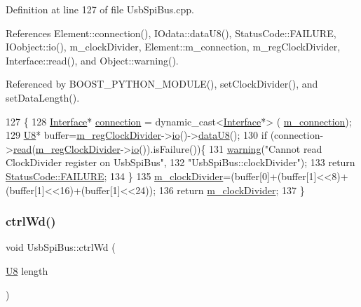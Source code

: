 Definition at line 127 of file Usb\+Spi\+Bus.\+cpp.



References Element\+::connection(), I\+Odata\+::data\+U8(), Status\+Code\+::\+F\+A\+I\+L\+U\+RE, I\+Oobject\+::io(), m\+\_\+clock\+Divider, Element\+::m\+\_\+connection, m\+\_\+reg\+Clock\+Divider, Interface\+::read(), and Object\+::warning().



Referenced by B\+O\+O\+S\+T\+\_\+\+P\+Y\+T\+H\+O\+N\+\_\+\+M\+O\+D\+U\+L\+E(), set\+Clock\+Divider(), and set\+Data\+Length().


\begin{DoxyCode}
127                                          \{
128   \hyperlink{classInterface}{Interface}* \hyperlink{classElement_af57444353c1ddf9fa0109801e97debf7}{connection} = \textcolor{keyword}{dynamic\_cast<}\hyperlink{classInterface}{Interface}*\textcolor{keyword}{>} (
      \hyperlink{classElement_abe3de7a5dbbc9a6dd2d7e012e5fdb266}{m\_connection});
129   \hyperlink{ICECALv3_8h_a3cb25ca6f51f003950f9625ff05536fc}{U8}* buffer=\hyperlink{classUsbSpiBus_abfd5f040a0a8c19d972b26ea581bf1f0}{m\_regClockDivider}->\hyperlink{classIOobject_af04fb94137c3d86849f478ac5afab5d1}{io}()->\hyperlink{classIOdata_a75e9c318dbac3a39402179070943d4bc}{dataU8}();
130   \textcolor{keywordflow}{if} (connection->\hyperlink{classInterface_a99136b67c8e6cbcaa0477c36940ac2ef}{read}(\hyperlink{classUsbSpiBus_abfd5f040a0a8c19d972b26ea581bf1f0}{m\_regClockDivider}->\hyperlink{classIOobject_af04fb94137c3d86849f478ac5afab5d1}{io}()).isFailure())\{
131     \hyperlink{classObject_a65cd4fda577711660821fd2cd5a3b4c9}{warning}(\textcolor{stringliteral}{"Cannot read ClockDivider register on UsbSpiBus"},
132         \textcolor{stringliteral}{"UsbSpiBus::clockDivider"});
133     \textcolor{keywordflow}{return} \hyperlink{classStatusCode_a6f565cbeadc76d14c72f047e5e85eb4ba3da73d4c469762eb9d3c960368252b26}{StatusCode::FAILURE};
134   \} 
135   \hyperlink{classUsbSpiBus_a5a4de2b61018f52b885559ce07bd3161}{m\_clockDivider}=(buffer[0]+(buffer[1]<<8)+(buffer[1]<<16)+(buffer[1]<<24));
136   \textcolor{keywordflow}{return} \hyperlink{classUsbSpiBus_a5a4de2b61018f52b885559ce07bd3161}{m\_clockDivider};
137 \}
\end{DoxyCode}
\mbox{\label{classUsbSpiBus_a150304008d73d14c93d25765050ddb05}} 
\subsubsection{\texorpdfstring{ctrl\+Wd()}{ctrlWd()}}
{\footnotesize\ttfamily void Usb\+Spi\+Bus\+::ctrl\+Wd (\begin{DoxyParamCaption}\item[{\hyperlink{classUsbSpiBus_a11336f4ad104fbd4fb454be044f19fc8}{U8}}]{length }\end{DoxyParamCaption})}



